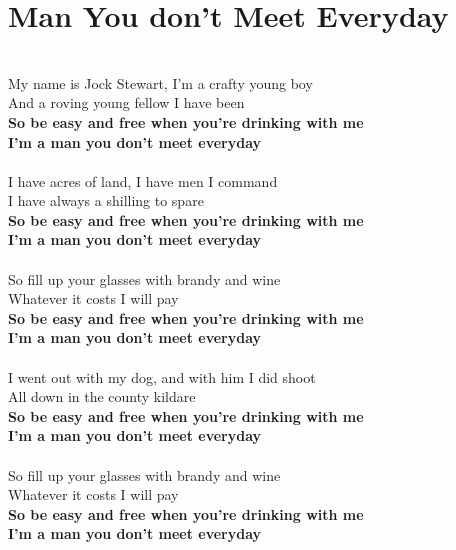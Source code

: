 \documentclass[letterpaper,9pt]{article}
\begin{document}
\section{Man You don't Meet Everyday}
\noindent
\\My name is Jock Stewart, I'm a crafty young boy
\\And a roving young fellow I have been
\\\textbf{So be easy and free when you're drinking with me
\\I'm a man you don't meet everyday}
\\
\\I have acres of land, I have men I command
\\I have always a shilling to spare
\\\textbf{So be easy and free when you're drinking with me
\\I'm a man you don't meet everyday}
\\
\\So fill up your glasses with brandy and wine
\\Whatever it costs I will pay
\\\textbf{So be easy and free when you're drinking with me
\\I'm a man you don't meet everyday}
\\
\\I went out with my dog, and with him I did shoot
\\All down in the county kildare
\\\textbf{So be easy and free when you're drinking with me
\\I'm a man you don't meet everyday}
\\
\\So fill up your glasses with brandy and wine
\\Whatever it costs I will pay
\\\textbf{So be easy and free when you're drinking with me
\\I'm a man you don't meet everyday}
\end{document}

